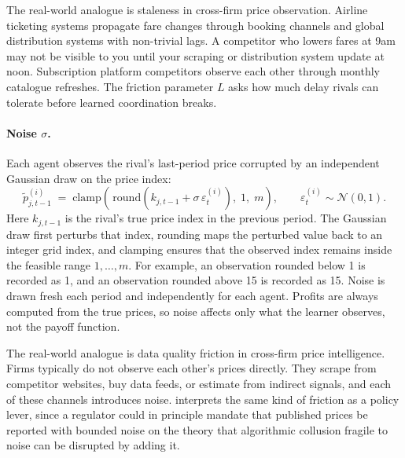 The real-world analogue is staleness in cross-firm price observation. Airline ticketing systems propagate fare changes through booking channels and global distribution systems with non-trivial lags. A competitor who lowers fares at 9am may not be visible to you until your scraping or distribution system update at noon. Subscription platform competitors observe each other through monthly catalogue refreshes. The friction parameter $L$ asks how much delay rivals can tolerate before learned coordination breaks.

\paragraph{Noise $\sigma$.}
Each agent observes the rival's last-period price corrupted by an independent Gaussian draw on the price index:
\begin{equation}
    \tilde p^{(i)}_{j,t-1} \;=\; \mathrm{clamp}\!\left(\,\mathrm{round}\!\left(k_{j,t-1} + \sigma\,\varepsilon^{(i)}_t\right),\; 1,\; m\right),\qquad \varepsilon^{(i)}_t\sim\mathcal N(0,1).
    \label{eq:noise}
\end{equation}
Here $k_{j,t-1}$ is the rival's true price index in the previous period. The Gaussian draw first perturbs that index, rounding maps the perturbed value back to an integer grid index, and clamping ensures that the observed index remains inside the feasible range $1,\dots,m$. For example, an observation rounded below 1 is recorded as 1, and an observation rounded above 15 is recorded as 15. Noise is drawn fresh each period and independently for each agent. Profits are always computed from the true prices, so noise affects only what the learner observes, not the payoff function.

The real-world analogue is data quality friction in cross-firm price intelligence. Firms typically do not observe each other's prices directly. They scrape from competitor websites, buy data feeds, or estimate from indirect signals, and each of these channels introduces noise. \citet{zhang2025} interprets the same kind of friction as a policy lever, since a regulator could in principle mandate that published prices be reported with bounded noise on the theory that algorithmic collusion fragile to noise can be disrupted by adding it.

